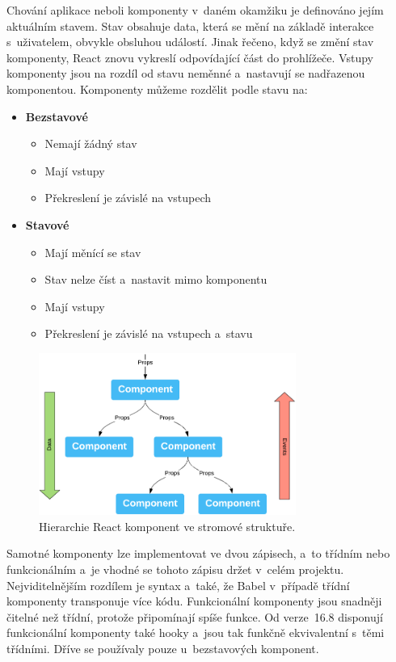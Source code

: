 Chování aplikace neboli komponenty v~daném okamžiku je definováno jejím aktuálním stavem. Stav obsahuje data, která se mění na základě interakce s~uživatelem, obvykle obsluhou událostí. Jinak řečeno, když se změní stav komponenty, React znovu vykreslí odpovídající část do prohlížeče. Vstupy komponenty jsou na rozdíl od stavu neměnné a~nastavují se nadřazenou komponentou. Komponenty můžeme rozdělit podle stavu na:
\begin{itemize}
    \item \textbf{Bezstavové}
        \begin{itemize}
            \item Nemají žádný stav
            \item Mají vstupy
            \item Překreslení je závislé na vstupech
        \end{itemize}
    \item \textbf{Stavové}
        \begin{itemize}
            \item Mají měnící se stav
            \item Stav nelze číst a~nastavit mimo komponentu
            \item Mají vstupy
            \item Překreslení je závislé na vstupech a~stavu
        \end{itemize}
\end{itemize}

\begin{figure}[hbt]
	\centering
	\setlength{\fboxsep}{0pt}
	\includegraphics[width=0.75\textwidth]{obrazky-figures/hierarchie_komponent.pdf}
	\caption{Hierarchie React komponent ve stromové struktuře.}
	\label{obr:Hierarchie komponent}
\end{figure}

Samotné komponenty lze implementovat ve dvou zápisech, a~to třídním nebo funkcionálním a~je vhodné se tohoto zápisu držet v~celém projektu. Nejviditelnějším rozdílem je syntax a~také, že Babel v~případě třídní komponenty transponuje více kódu. Funkcionální komponenty jsou snadněji čitelné než třídní, protože připomínají spíše funkce. Od verze~16.8 disponují funkcionální komponenty také hooky a~jsou tak funkčně ekvivalentní s~těmi třídními. Dříve se používaly pouze u~bezstavových komponent.

